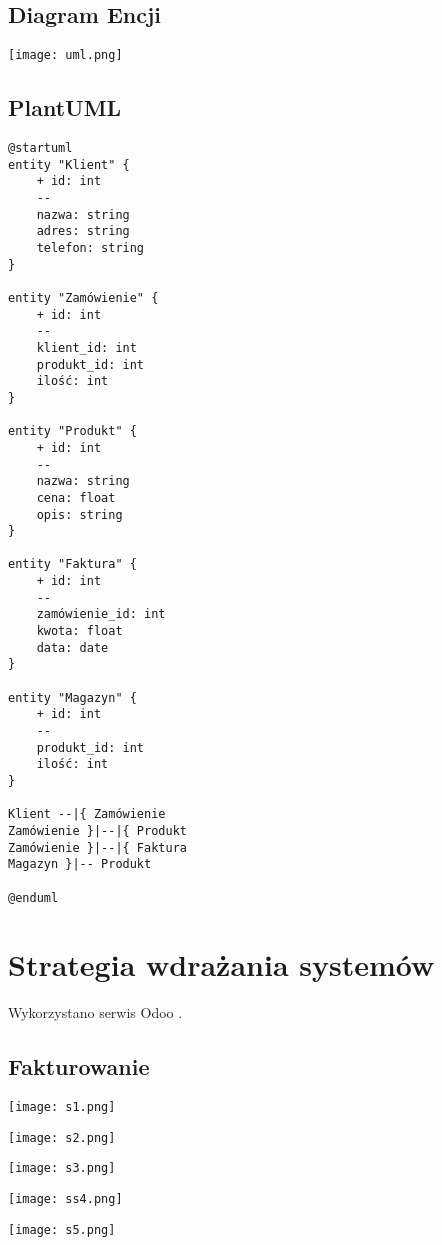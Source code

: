 \subsection*{Diagram Encji}
\begin{center}
    \texttt{[image: uml.png]}\\[0.5cm]
\end{center}
\subsection*{PlantUML}
\begin{tiny}
    \begin{verbatim}
@startuml
entity "Klient" {
    + id: int
    --
    nazwa: string
    adres: string
    telefon: string
}

entity "Zamówienie" {
    + id: int
    --
    klient_id: int
    produkt_id: int
    ilość: int
}

entity "Produkt" {
    + id: int
    --
    nazwa: string
    cena: float
    opis: string
}

entity "Faktura" {
    + id: int
    --
    zamówienie_id: int
    kwota: float
    data: date
}

entity "Magazyn" {
    + id: int
    --
    produkt_id: int
    ilość: int
}

Klient --|{ Zamówienie
Zamówienie }|--|{ Produkt
Zamówienie }|--|{ Faktura
Magazyn }|-- Produkt

@enduml

\end{verbatim}
\end{tiny}

\section{Strategia wdrażania systemów}

Wykorzystano serwis Odoo \cite{odoo}.

\subsection*{Fakturowanie}
\begin{center}
    \texttt{[image: s1.png]}\\[0.5cm]
\end{center}
\begin{center}
    \texttt{[image: s2.png]}\\[0.5cm]
\end{center}
\begin{center}
    \texttt{[image: s3.png]}\\[0.5cm]
\end{center}
\begin{center}
    \texttt{[image: ss4.png]}\\[0.5cm]
\end{center}
\begin{center}
    \texttt{[image: s5.png]}\\[0.5cm]
\end{center}



